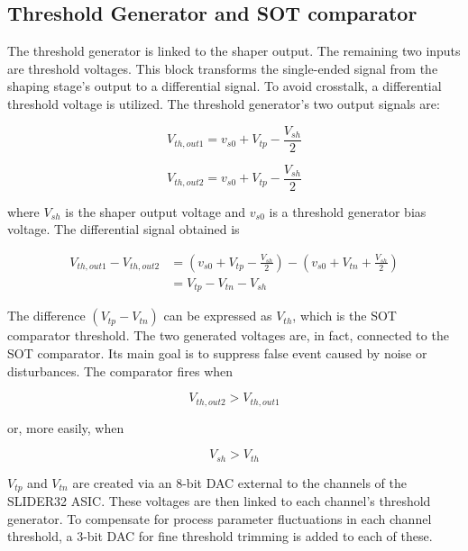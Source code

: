 
\subsection{Threshold Generator and SOT comparator} \label{thrSOT}
The threshold generator is linked to the shaper output. The remaining two inputs are threshold voltages. This block transforms the single-ended signal from the shaping stage's output to a differential signal. To avoid crosstalk, a differential threshold voltage is utilized. The threshold generator's two output signals are:

\begin{equation}
    V_{th, out1} = v_{s0} + V_{tp} - \frac{V_{sh}}{2}
\end{equation}

\begin{equation}
    V_{th, out2} = v_{s0} + V_{tp} - \frac{V_{sh}}{2}
\end{equation}

\noindent
where $V_{sh}$ is the shaper output voltage and $v_{s0}$ is a threshold generator bias voltage. The differential signal obtained is

\begin{equation}
    \begin{split}
        V_{th, out1} - V_{th, out2} & = (v_{s0} + V_{tp} - \frac{V_{sh}}{2}) - (v_{s0} + V_{tn} + \frac{V_{sh}}{2}) \\
        & = V_{tp} - V_{tn} - V_{sh}
    \end{split}
\end{equation}

The difference $(V_{tp} - V_{tn})$ can be expressed as $V_{th}$, which is the SOT comparator threshold. The two generated voltages are, in fact, connected to the SOT comparator. Its main goal is to suppress false event caused by noise or disturbances. The comparator fires when

\begin{equation}
    V_{th, out2} > V_{th, out1}
\end{equation}

\noindent
or, more easily, when

\begin{equation}
    V_{sh} > V_{th}
\end{equation}

\noindent
$V_{tp}$ and $V_{tn}$ are created via an 8-bit DAC external to the channels of the SLIDER32 ASIC. These voltages are then linked to each channel's threshold generator. To compensate for process parameter fluctuations in each channel threshold, a 3-bit DAC for fine threshold trimming is added to each of these.

